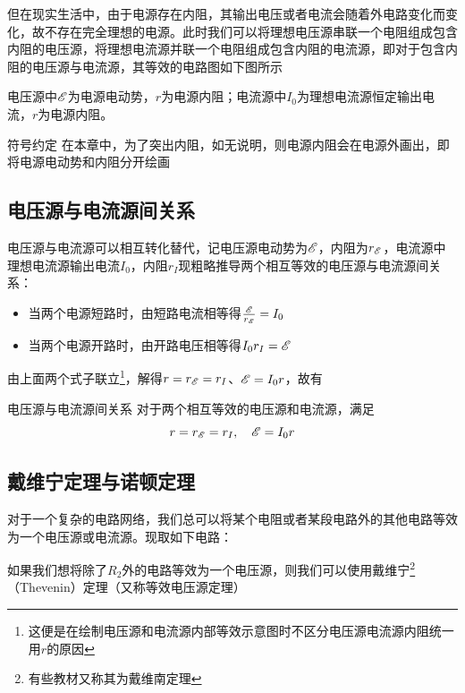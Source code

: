 但在现实生活中，由于电源存在内阻，其输出电压或者电流会随着外电路变化而变化，故不存在完全理想的电源。此时我们可以将理想电压源串联一个电阻组成包含内阻的电压源，将理想电流源并联一个电阻组成包含内阻的电流源，即对于包含内阻的电压源与电流源，其等效的电路图如下图所示



电压源中$\mathscr{E}$为电源电动势，$r$为电源内阻；电流源中$I_0$为理想电流源恒定输出电流，$r$为电源内阻。

\begin{mk}{符号约定}{}
在本章中，为了突出内阻，如无说明，则电源内阻会在电源外画出，即将电源电动势和内阻分开绘画
\end{mk}

\subsection{电压源与电流源间关系}
\label{dyydlygx}

电压源与电流源可以相互转化替代，记电压源电动势为$\mathscr{E}$，内阻为$r_{\mathscr{E}}$，电流源中理想电流源输出电流$I_0$，内阻$r_I$现粗略推导两个相互等效的电压源与电流源间关系：

\begin{itemize}
\item 当两个电源短路时，由短路电流相等得$\frac{\mathscr{E}}{r_{\mathscr{E}}} = I_0$
\item 当两个电源开路时，由开路电压相等得$I_0 r_I = \mathscr{E}$
\end{itemize}

由上面两个式子联立\footnote{这便是在绘制电压源和电流源内部等效示意图时不区分电压源电流源内阻统一用$r$的原因}，解得$r = r_{\mathscr{E}} = r_{I}$、$\mathscr{E} = I_0 r $，故有

\begin{theo}{电压源与电流源间关系}{}
对于两个相互等效的电压源和电流源，满足
$$r = r_{\mathscr{E}} = r_{I} ,\quad \mathscr{E} = I_0 r$$
\end{theo}

\subsection{戴维宁定理与诺顿定理}

对于一个复杂的电路网络，我们总可以将某个电阻或者某段电路外的其他电路等效为一个电压源或电流源。现取如下电路：



如果我们想将除了$R_2$外的电路等效为一个电压源，则我们可以使用戴维宁\footnote{有些教材又称其为戴维南定理}（Thevenin）定理（又称等效电压源定理）

